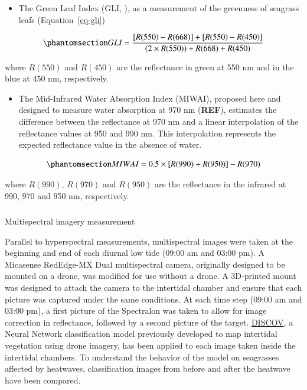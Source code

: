 \documentclass[
  number]{elsarticle}
\makeatletter
\let\oldsubparagraph\subparagraph
\renewcommand{\subparagraph}{
    \@ifstar
      \xxxSubParagraphStar
      \xxxSubParagraphNoStar
  }
\newcommand{\xxxSubParagraphStar}[1]{\oldsubparagraph*{#1}\mbox{}}
\newcommand{\xxxSubParagraphNoStar}[1]{\oldsubparagraph{#1}\mbox{}}
\providecommand{\tightlist}{%
  \setlength{\itemsep}{0pt}\setlength{\parskip}{0pt}}\usepackage{longtable,booktabs,array}
\makeatother
\begin{document}
\begin{itemize}
\tightlist
\item
  The Green Leaf Index (GLI, \citep{louhaichi2001spatially}), as a
  measurement of the greenness of seagrass leafs (Equation~\ref{eq-gli})
\end{itemize}

\begin{equation}\phantomsection\label{eq-gli}{
GLI = \frac{[R(550)-R(668)]+[R(550)-R(450)]}{(2 \times R(550) )+ R(668) + R(450) }
}\end{equation}

where \(R(550)\) and \(R(450)\) are the reflectance in green at 550 nm
and in the blue at 450 nm, respectively.

\begin{itemize}
\tightlist
\item
  The Mid-Infrared Water Absorption Index (MIWAI), proposed here and
  designed to measure water absorption at 970 nm (\textbf{REF}),
  estimates the difference between the reflectance at 970 nm and a
  linear interpolation of the reflectance values at 950 and 990 nm. This
  interpolation represents the expected reflectance value in the absence
  of water.
\end{itemize}

\begin{equation}\phantomsection\label{eq-MIWAI}{
MIWAI = 0.5 \times [R(990)+R(950)]-R(970)
}\end{equation}

where \(R(990)\), \(R(970)\) and \(R(950)\) are the reflectance in the
infrared at 990, 970 and 950 nm, respectively.

\subparagraph{Multispectral imagery
measurement}\label{multispectral-imagery-measurement}

Parallel to hyperspectral measurements, multispectral images were taken
at the beginning and end of each diurnal low tide (09:00 am and 03:00
pm). A Micasense RedEdge-MX Dual multispectral camera, originally
designed to be mounted on a drone, was modified for use without a drone.
A 3D-printed mount was designed to attach the camera to the intertidal
chamber and ensure that each picture was captured under the same
conditions. At each time step (09:00 am and 03:00 pm), a first picture
of the Spectralon was taken to allow for image correction in
reflectance, followed by a second picture of the target.
\href{https://sigoiry.github.io/DISCOV-MicaSense/}{DISCOV}, a Neural
Network classification model previously developed to map intertidal
vegetation using drone imagery, has been applied to each image taken
inside the intertidal chambers. To understand the behavior of the model
on seagrasses affected by heatwaves, classification images from before
and after the heatwave have been compared.
\end{document}
